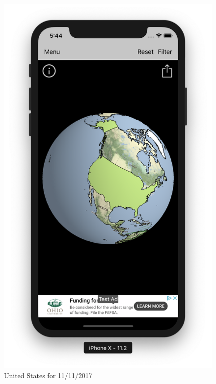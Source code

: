 \begin{frame}
\begin{columns}
\begin{figure}
    \centering
    \begin{minipage}{.5\columnwidth}
    \includegraphics[width=1.0\linewidth]{final/figures/admin_level_0_a.png}
    \caption{United States for 11/11/2017}
    \end{minipage}
\end{figure}
\end{columns}
\end{frame}

